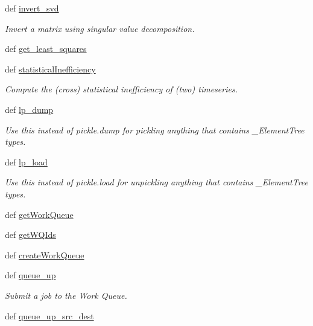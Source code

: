 \begin{DoxyCompactItemize}
def \hyperlink{namespaceforcebalance_1_1nifty_a4c82187e92dfeb8a159f4aa44b501c40}{invert\-\_\-svd}
\begin{DoxyCompactList}\small\item\em \-Invert a matrix using singular value decomposition. \end{DoxyCompactList}\item 
def \hyperlink{namespaceforcebalance_1_1nifty_aa9fb9c7c65231eca50a7afc04f489b64}{get\-\_\-least\-\_\-squares}
\item 
def \hyperlink{namespaceforcebalance_1_1nifty_ad5ca60565c864b4245a8212fe9d92e10}{statistical\-Inefficiency}
\begin{DoxyCompactList}\small\item\em \-Compute the (cross) statistical inefficiency of (two) timeseries. \end{DoxyCompactList}\item 
def \hyperlink{namespaceforcebalance_1_1nifty_a2ff762a2f2d2b6bb1c7dd067bd1a1e88}{lp\-\_\-dump}
\begin{DoxyCompactList}\small\item\em \-Use this instead of pickle.\-dump for pickling anything that contains \-\_\-\-Element\-Tree types. \end{DoxyCompactList}\item 
def \hyperlink{namespaceforcebalance_1_1nifty_a577abfd36638c5f4dfdade136abaef12}{lp\-\_\-load}
\begin{DoxyCompactList}\small\item\em \-Use this instead of pickle.\-load for unpickling anything that contains \-\_\-\-Element\-Tree types. \end{DoxyCompactList}\item 
def \hyperlink{namespaceforcebalance_1_1nifty_ac37d4fe58ef70ed546ebfc45d12f7a5d}{get\-Work\-Queue}
\item 
def \hyperlink{namespaceforcebalance_1_1nifty_abe1e72c32252d62a6551b47290c7584f}{get\-W\-Q\-Ids}
\item 
def \hyperlink{namespaceforcebalance_1_1nifty_ab5f3072ad95e9c75659cb1adac341051}{create\-Work\-Queue}
\item 
def \hyperlink{namespaceforcebalance_1_1nifty_a673f4a044169f5d8d822823989a836a7}{queue\-\_\-up}
\begin{DoxyCompactList}\small\item\em \-Submit a job to the \-Work \-Queue. \end{DoxyCompactList}\item 
def \hyperlink{namespaceforcebalance_1_1nifty_a5d5abeb4a185fde64721d044831e18ee}{queue\-\_\-up\-\_\-src\-\_\-dest}

\end{DoxyCompactItemize}

